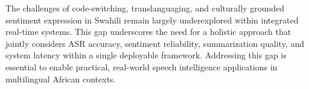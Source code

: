 The challenges of code-switching, translanguaging, and culturally grounded sentiment expression in Swahili remain largely underexplored within integrated real-time systems. This gap underscores the need for a holistic approach that jointly considers ASR accuracy, sentiment reliability, summarization quality, and system latency within a single deployable framework. Addressing this gap is essential to enable practical, real-world speech intelligence applications in multilingual African contexts.


